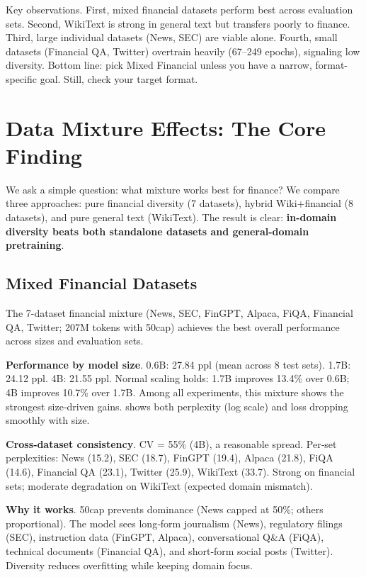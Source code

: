 Key observations. First, mixed financial datasets perform best across evaluation sets. Second, WikiText is strong in general text but transfers poorly to finance. Third, large individual datasets (News, SEC) are viable alone. Fourth, small datasets (Financial QA, Twitter) overtrain heavily (67--249 epochs), signaling low diversity. Bottom line: pick Mixed Financial unless you have a narrow, format-specific goal. Still, check your target format.

\section{Data Mixture Effects: The Core Finding}

We ask a simple question: what mixture works best for finance? We compare three approaches: pure financial diversity (7 datasets), hybrid Wiki+financial (8 datasets), and pure general text (WikiText). The result is clear: \textbf{in-domain diversity beats both standalone datasets and general-domain pretraining}.

\subsection{Mixed Financial Datasets}

The 7-dataset financial mixture (News, SEC, FinGPT, Alpaca, FiQA, Financial QA, Twitter; 207M tokens with 50cap) achieves the best overall performance across sizes and evaluation sets.

\textbf{Performance by model size}. 0.6B: 27.84 ppl (mean across 8 test sets). 1.7B: 24.12 ppl. 4B: 21.55 ppl. Normal scaling holds: 1.7B improves 13.4\% over 0.6B; 4B improves 10.7\% over 1.7B. Among all experiments, this mixture shows the strongest size‑driven gains.  shows both perplexity (log scale) and loss dropping smoothly with size.

\textbf{Cross‑dataset consistency}. CV = 55\% (4B), a reasonable spread. Per‑set perplexities: News (15.2), SEC (18.7), FinGPT (19.4), Alpaca (21.8), FiQA (14.6), Financial QA (23.1), Twitter (25.9), WikiText (33.7). Strong on financial sets; moderate degradation on WikiText (expected domain mismatch).

\textbf{Why it works}. 50cap prevents dominance (News capped at 50\%; others proportional). The model sees long‑form journalism (News), regulatory filings (SEC), instruction data (FinGPT, Alpaca), conversational Q\&A (FiQA), technical documents (Financial QA), and short‑form social posts (Twitter). Diversity reduces overfitting while keeping domain focus.

